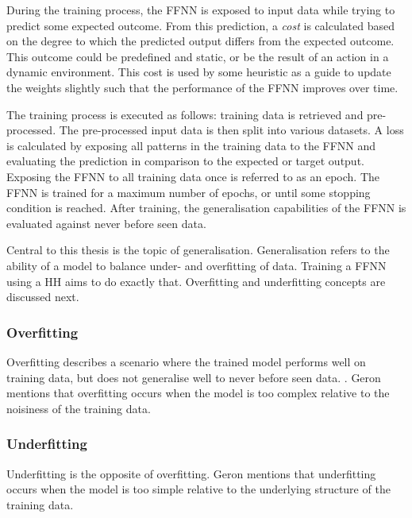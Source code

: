 During the training process, the \ac{FFNN} is exposed to input data while
trying to predict some expected outcome. From this prediction, a \textit{cost}
is calculated based on the degree to which the predicted output differs from the
expected outcome. This outcome could be predefined and static, or be the result
of an action in a dynamic environment. This cost is used by some
heuristic as a guide to update the weights slightly such that
the performance of the \ac{FFNN} improves over time.

The training process is executed as follows: training data is retrieved and
pre-processed. The pre-processed input data is then split into various datasets.
A loss is calculated by exposing all patterns in the training data to the
\ac{FFNN} and evaluating the  prediction in comparison to the expected or target
output. Exposing the \ac{FFNN} to all training data once is referred to as an
epoch. The \ac{FFNN} is trained for a maximum number of epochs, or until some
stopping condition is reached. After training, the generalisation capabilities
of the \ac{FFNN} is evaluated against never before seen data.

Central to this thesis is the topic of generalisation. Generalisation refers to
the ability of a model to balance under- and overfitting of data. Training a
\ac{FFNN} using a \ac{HH} aims to do exactly that. Overfitting and underfitting
concepts are discussed next.

\subsubsection{Overfitting}
\label{sec:anns:training:overfitting}

Overfitting describes a scenario where the trained model
performs well on training data, but does not generalise well to never before
seen data. \cite{ref:tetko:1995, ref:geron:2017}. Geron \cite{ref:geron:2017}
mentions that overfitting occurs when the model is too
complex relative to the noisiness of the training data.


\subsubsection{Underfitting}
\label{sec:anns:training:generalisation_capabilities:underfitting}

Underfitting is the opposite of
overfitting. Geron \cite{ref:geron:2017} mentions that
underfitting occurs when the model is too simple relative to
the underlying structure of the training data.


